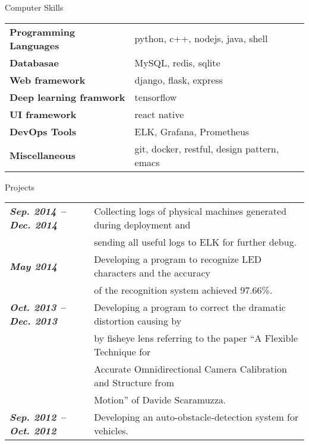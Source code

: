 \documentclass{resume} %
\begin{document}
\begin{rSection}{Computer Skills}

  \begin{tabular}{ @{} >{\bfseries}l @{\hspace{6ex}} l }
    Programming Languages  & python, c++, nodejs, java, shell \\
    Databasae  & MySQL, redis, sqlite \\
    Web framework & django, flask, express \\
    Deep learning framwork & tensorflow \\
    UI framework & react native \\
    DevOps Tools  & ELK, Grafana, Prometheus \\
    Miscellaneous & git, docker, restful, design pattern, emacs
  \end{tabular}
\end{rSection}

\newpage
\begin{rSection}{Projects}
  \begin{tabular}{ @{} >{\bfseries}l @{\hspace{6ex}} l }

    {\em Sep. 2014 – Dec. 2014} &  Collecting logs of physical machines generated during deployment and \\
    {\ }  & sending all useful logs to ELK for further debug. \\

    {\em May 2014} & Developing a program to recognize LED characters and the accuracy \\
    {\ } & of the recognition system achieved 97.66\%. \\

    {\em Oct. 2013 – Dec. 2013} &  Developing a program to correct the dramatic distortion causing by \\
    {\ } & by fisheye lens referring to the paper ``A Flexible Technique for \\
    {\ } & Accurate Omnidirectional Camera Calibration and Structure from \\
    {\ } & Motion'' of Davide Scaramuzza. \\

    {\em Sep. 2012 – Oct. 2012} & Developing an auto-obstacle-detection system for vehicles. \\

  \end{tabular}

\end{rSection}
\end{document}
